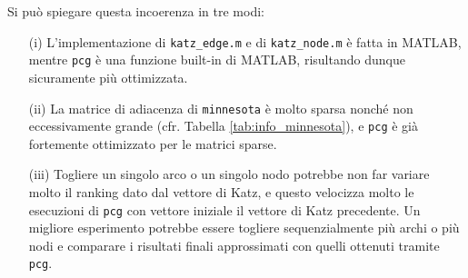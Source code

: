 \documentclass[a4paper]{article}
\begin{document}
	Si può spiegare questa incoerenza in tre modi:
	
	\begin{itemize}
		\item[(i)] L'implementazione di \texttt{katz\_edge.m} e di \texttt{katz\_node.m} è fatta in MATLAB, mentre
		      \texttt{pcg} è una funzione built-in di MATLAB, risultando dunque sicuramente più ottimizzata.
		      
		\item[(ii)] La matrice di adiacenza di \texttt{minnesota} è molto sparsa nonché non eccessivamente grande (cfr. Tabella \ref{tab:info_minnesota}),
		      e \texttt{pcg} è già fortemente ottimizzato per le matrici sparse.
		      
		\item[(iii)] Togliere un singolo arco o un singolo nodo potrebbe non far variare molto il ranking dato dal vettore
		      di Katz, e questo velocizza molto le esecuzioni di \texttt{pcg} con vettore iniziale il vettore di Katz precedente. Un migliore esperimento potrebbe essere togliere sequenzialmente più archi o più nodi e comparare i risultati
		      finali approssimati con quelli ottenuti tramite \texttt{pcg}.
	\end{itemize}
	
	\printbibliography
	
\end{document}
